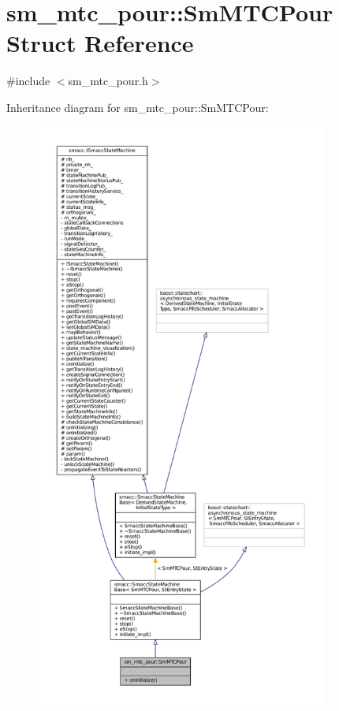 \hypertarget{structsm__mtc__pour_1_1SmMTCPour}{}\section{sm\+\_\+mtc\+\_\+pour\+:\+:Sm\+M\+T\+C\+Pour Struct Reference}
\label{structsm__mtc__pour_1_1SmMTCPour}


{\ttfamily \#include $<$sm\+\_\+mtc\+\_\+pour.\+h$>$}



Inheritance diagram for sm\+\_\+mtc\+\_\+pour\+:\+:Sm\+M\+T\+C\+Pour\+:
\nopagebreak
\begin{figure}[H]
\begin{center}
\leavevmode
\includegraphics[height=550pt]{structsm__mtc__pour_1_1SmMTCPour__inherit__graph}
\end{center}
\end{figure}


